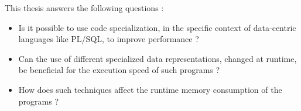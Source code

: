\documentclass[twoside,11pt,a4paper]{article}
\begin{document}
This thesis answers the following questions :
\begin{itemize}
\item Is it possible to use code specialization, in the specific context of data-centric languages like PL/SQL, to improve performance ?
\item Can the use of different specialized data representations, changed at runtime, be beneficial for the execution speed of such programs ?
\item How does such techniques affect the runtime memory consumption of the programs ?
\end{itemize}

%
%
%
%
%
%
%
%
\end{document}
